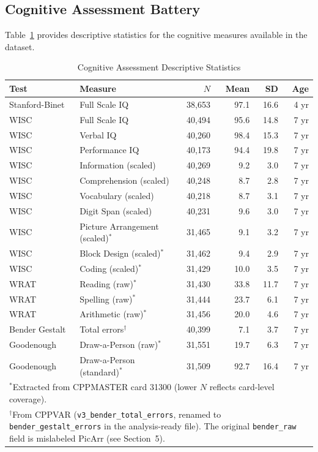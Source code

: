 \documentclass[12pt]{article}
\begin{document}
\subsection{Cognitive Assessment Battery}

Table~\ref{tab:cognitive} provides descriptive statistics for the cognitive measures available in the dataset.

\begin{table}[H]
\centering
\caption{Cognitive Assessment Descriptive Statistics}
\label{tab:cognitive}
\begin{tabular}{llrrrr}
\toprule
Test & Measure & $N$ & Mean & SD & Age \\
\midrule
Stanford-Binet & Full Scale IQ & 38,653 & 97.1 & 16.6 & 4 yr \\
\addlinespace
WISC & Full Scale IQ & 40,494 & 95.6 & 14.8 & 7 yr \\
WISC & Verbal IQ & 40,260 & 98.4 & 15.3 & 7 yr \\
WISC & Performance IQ & 40,173 & 94.4 & 19.8 & 7 yr \\
\addlinespace
WISC & Information (scaled) & 40,269 & 9.2 & 3.0 & 7 yr \\
WISC & Comprehension (scaled) & 40,248 & 8.7 & 2.8 & 7 yr \\
WISC & Vocabulary (scaled) & 40,218 & 8.7 & 3.1 & 7 yr \\
WISC & Digit Span (scaled) & 40,231 & 9.6 & 3.0 & 7 yr \\
WISC & Picture Arrangement (scaled)$^*$ & 31,465 & 9.1 & 3.2 & 7 yr \\
WISC & Block Design (scaled)$^*$ & 31,462 & 9.4 & 2.9 & 7 yr \\
WISC & Coding (scaled)$^*$ & 31,429 & 10.0 & 3.5 & 7 yr \\
\addlinespace
WRAT & Reading (raw)$^*$ & 31,430 & 33.8 & 11.7 & 7 yr \\
WRAT & Spelling (raw)$^*$ & 31,444 & 23.7 & 6.1 & 7 yr \\
WRAT & Arithmetic (raw)$^*$ & 31,456 & 20.0 & 4.6 & 7 yr \\
Bender Gestalt & Total errors$^\dagger$ & 40,399 & 7.1 & 3.7 & 7 yr \\
Goodenough & Draw-a-Person (raw)$^*$ & 31,551 & 19.7 & 6.3 & 7 yr \\
Goodenough & Draw-a-Person (standard)$^*$ & 31,509 & 92.7 & 16.4 & 7 yr \\
\bottomrule
\multicolumn{6}{l}{\small $^*$Extracted from CPPMASTER card 31300 (lower $N$ reflects card-level coverage).} \\
\multicolumn{6}{l}{\small $^\dagger$From CPPVAR (\texttt{v3\_bender\_total\_errors}, renamed to \texttt{bender\_gestalt\_errors} in the analysis-ready file). The original \texttt{bender\_raw} field is mislabeled PicArr (see Section~5).}
\end{tabular}
\end{table}
\end{document}
